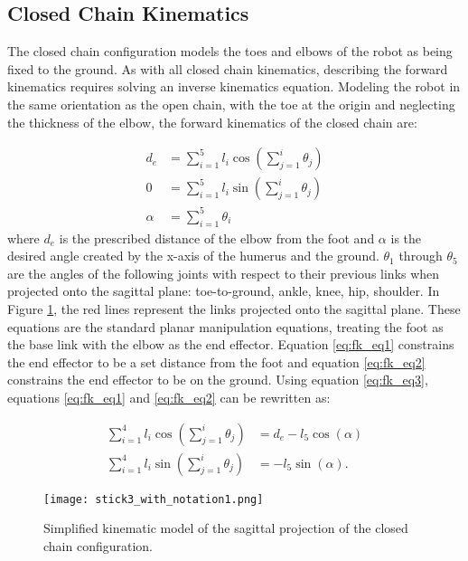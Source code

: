 \subsection{Closed Chain Kinematics} \label{subsec:crawl_closed_chain}

The closed chain configuration models the toes and elbows of the robot as being fixed to the ground.
As with all closed chain kinematics, describing the forward kinematics requires solving an inverse
kinematics equation. Modeling the robot in the same orientation as the open chain, with the toe at the origin
and neglecting the thickness of the elbow,
the forward kinematics of the closed chain are:

\begin{align}
	d_e &= \sum_{i=1}^5 l_i \cos(\sum_{j=1}^i \theta_j) \label{eq:fk_eq1}\\
	0 &= \sum_{i=1}^5 l_i \sin(\sum_{j=1}^i \theta_j) \label{eq:fk_eq2} \\
	\alpha &=\sum_{i=1}^5 \theta_i \label{eq:fk_eq3}
\end{align}
where $d_e$ is the prescribed distance of the elbow from the foot and $\alpha$ is the desired angle
created by the x-axis of the humerus and the ground.
$\theta_1$ through $\theta_5$ are the angles of the following joints with respect to their previous links when projected onto the sagittal plane:
toe-to-ground, ankle, knee, hip, shoulder. In Figure \ref{fig:pp_stick1}, the red lines represent the links projected onto the sagittal plane.
These equations are the standard planar manipulation equations, treating the foot as the base link 
with the elbow as the end effector.
Equation \ref{eq:fk_eq1} constrains the end effector to be a set distance from the foot and 
equation \ref{eq:fk_eq2} constrains the end effector to be on the ground.
Using equation \ref{eq:fk_eq3}, equations \ref{eq:fk_eq1} and \ref{eq:fk_eq2} can be rewritten as:

\begin{align}
\sum_{i=1}^4 l_i \cos(\sum_{j=1}^i \theta_j) &= d_e - l_5 \cos(\alpha) \label{eq:sum_cos1} \\
\sum_{i=1}^4 l_i \sin(\sum_{j=1}^i \theta_j) &= - l_5 \sin(\alpha). \label{eq:sum_sin1}
\end{align}

\begin{figure}
	\centering
	\texttt{[image: stick3\_with\_notation1.png]}
	\caption
	{Simplified kinematic model of the sagittal projection of the closed chain configuration.}
	\label{fig:pp_stick1}
\end{figure}

